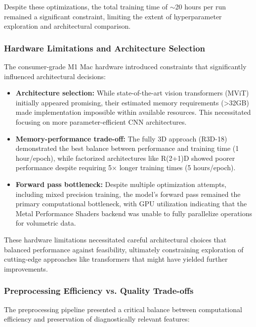 \documentclass[12pt, a4paper]{article}
\begin{document}
Despite these optimizations, the total training time of $\sim$20 hours per run remained a significant constraint, limiting the extent of hyperparameter exploration and architectural comparison.

\subsubsection{Hardware Limitations and Architecture Selection}

The consumer-grade M1 Mac hardware introduced constraints that significantly influenced architectural decisions:

\begin{itemize}
    \item \textbf{Architecture selection:} While state-of-the-art vision transformers (MViT) initially appeared promising, their estimated memory requirements (>32GB) made implementation impossible within available resources. This necessitated focusing on more parameter-efficient CNN architectures.
    
    \item \textbf{Memory-performance trade-off:} The fully 3D approach (R3D-18) demonstrated the best balance between performance and training time (1 hour/epoch), while factorized architectures like R(2+1)D showed poorer performance despite requiring 5× longer training times (5 hours/epoch).
    
    \item \textbf{Forward pass bottleneck:} Despite multiple optimization attempts, including mixed precision training, the model's forward pass remained the primary computational bottleneck, with GPU utilization indicating that the Metal Performance Shaders backend was unable to fully parallelize operations for volumetric data.
\end{itemize}

These hardware limitations necessitated careful architectural choices that balanced performance against feasibility, ultimately constraining exploration of cutting-edge approaches like transformers that might have yielded further improvements.

\subsubsection{Preprocessing Efficiency vs. Quality Trade-offs}

The preprocessing pipeline presented a critical balance between computational efficiency and preservation of diagnostically relevant features:
\end{document}
